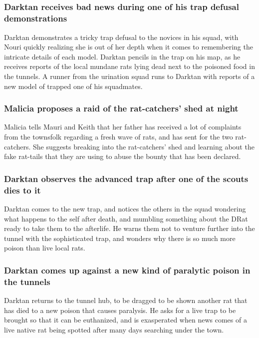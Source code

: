 \subsection{}
\subsubsection{\Gls{Darktan} receives bad news during one of his trap defusal demonstrations}
\Gls{Darktan} demonstrates a tricky trap defusal to the novices in his squad, with \Gls{Nouri}
quickly realizing she is out of her depth when it comes to remembering the intricate details of each
model. \Gls{Darktan} pencils in the trap on his map, as he receives reports of the local mundane
rats lying dead next to the poisoned food in the tunnels. A runner from the urination squad runs to
\Gls{Darktan} with reports of a new model of trapped one of his squadmates.

\subsubsection{\Gls{Malicia} proposes a raid of the rat-catchers' shed at night}
\Gls{Malicia} tells \Gls{Mauri} and \Gls{Keith} that her father has received a lot of complaints
from the townsfolk regarding a fresh wave of rats, and has sent for the two rat-catchers. She
suggests breaking into the rat-catchers' shed and learning about the fake rat-tails that they are
using to abuse the bounty that has been declared.

\subsubsection{\Gls{Darktan} observes the advanced trap after one of the scouts dies to it}
\Gls{Darktan} comes to the new trap, and notices the others in the squad wondering what happens to
the self after death, and mumbling something about the \Gls{DRat} ready to take them to the
afterlife. He warns them not to venture further into the tunnel with the sophisticated trap, and
wonders why there is so much more poison than live local rats.

\subsubsection{\Gls{Darktan} comes up against a new kind of paralytic poison in the tunnels}
\Gls{Darktan} returns to the tunnel hub, to be dragged to be shown another rat that has died to a
new poison that causes paralysis. He asks for a live trap to be brought so that it can be
euthanized, and is exasperated when news comes of a live native rat being spotted after many days
searching under the town.

